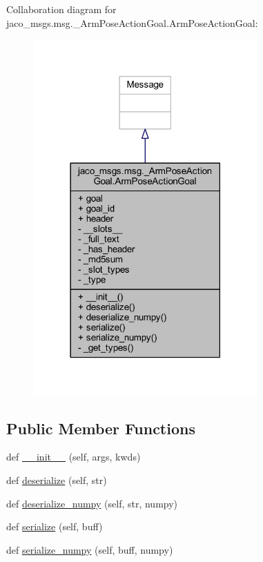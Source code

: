 Collaboration diagram for jaco\+\_\+msgs.\+msg.\+\_\+\+Arm\+Pose\+Action\+Goal.\+Arm\+Pose\+Action\+Goal\+:
\nopagebreak
\begin{figure}[H]
\begin{center}
\leavevmode
\includegraphics[width=242pt]{d1/d1b/classjaco__msgs_1_1msg_1_1__ArmPoseActionGoal_1_1ArmPoseActionGoal__coll__graph}
\end{center}
\end{figure}
\subsection*{Public Member Functions}
\begin{DoxyCompactItemize}
\item 
def \hyperlink{classjaco__msgs_1_1msg_1_1__ArmPoseActionGoal_1_1ArmPoseActionGoal_a351a6efec2b745e1a263e0e9c3af0a3a}{\+\_\+\+\_\+init\+\_\+\+\_\+} (self, args, kwds)
\item 
def \hyperlink{classjaco__msgs_1_1msg_1_1__ArmPoseActionGoal_1_1ArmPoseActionGoal_ae28be14fa540bb416b33554e9b4723da}{deserialize} (self, str)
\item 
def \hyperlink{classjaco__msgs_1_1msg_1_1__ArmPoseActionGoal_1_1ArmPoseActionGoal_acfb9b552e31367c062e2b303ef388f39}{deserialize\+\_\+numpy} (self, str, numpy)
\item 
def \hyperlink{classjaco__msgs_1_1msg_1_1__ArmPoseActionGoal_1_1ArmPoseActionGoal_a9d7cf2e6929e9ea18a414149c6c9690e}{serialize} (self, buff)
\item 
def \hyperlink{classjaco__msgs_1_1msg_1_1__ArmPoseActionGoal_1_1ArmPoseActionGoal_a0e68efd27374a71e275be9c5fd4421e5}{serialize\+\_\+numpy} (self, buff, numpy)
\end{DoxyCompactItemize}
